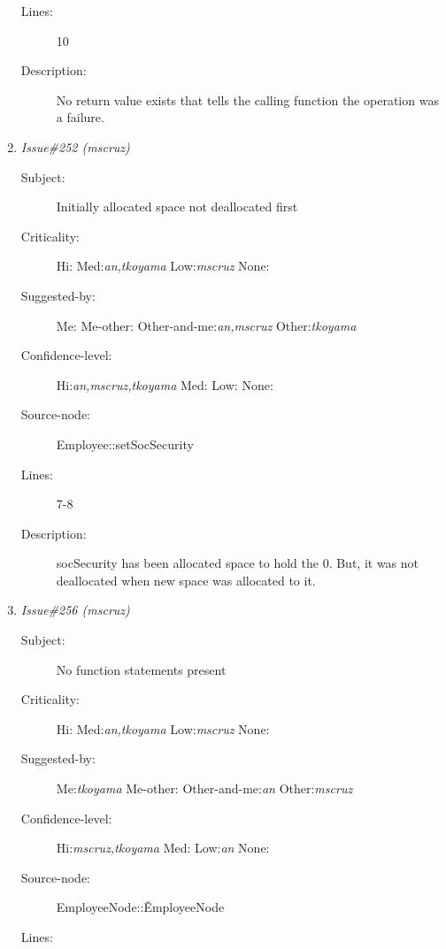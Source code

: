 \begin{enumerate}
\begin{description}
\item [Lines:] 10

\item [Description:] No return value exists that tells the calling
function the operation was a failure.
\end{description}
\item {\it Issue\#252 (mscruz)}
\begin{description}
\item [Subject:] Initially allocated space not deallocated first
\item [Criticality:] Hi:{\it } Med:{\it an,tkoyama} Low:{\it mscruz} None:{\it }
\item [Suggested-by:] Me:{\it } Me-other:{\it } Other-and-me:{\it an,mscruz} Other:{\it tkoyama}
\item [Confidence-level:] Hi:{\it an,mscruz,tkoyama} Med:{\it } Low:{\it } None:{\it }
\item [Source-node:] Employee::setSocSecurity

\item [Lines:] 7-8

\item [Description:] socSecurity has been allocated space to hold
the 0.  But, it was not deallocated when new space was allocated to it.
\end{description}
\item {\it Issue\#256 (mscruz)}
\begin{description}
\item [Subject:] No function statements present
\item [Criticality:] Hi:{\it } Med:{\it an,tkoyama} Low:{\it mscruz} None:{\it }
\item [Suggested-by:] Me:{\it tkoyama} Me-other:{\it } Other-and-me:{\it an} Other:{\it mscruz}
\item [Confidence-level:] Hi:{\it mscruz,tkoyama} Med:{\it } Low:{\it an} None:{\it }
\item [Source-node:] EmployeeNode::\~EmployeeNode

\item [Lines:] 


\end{description}
\end{enumerate}
